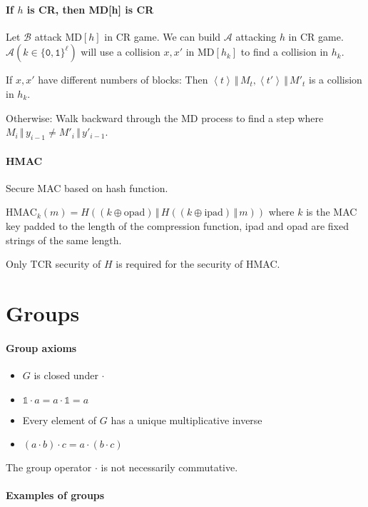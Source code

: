 \documentclass[11pt]{article}
\newcommand{\bit}{\ensuremath{\{\texttt{0},\texttt{1}\}}}
\newcommand{\ang}[1]{\ensuremath{\left\langle#1\right\rangle}}
\newcommand{\I}{\ensuremath{\mathds{1}}}
\theoremstyle{remark}
\begin{document}
\paragraph{If $h$ is CR, then MD[h] is CR}
Let $\mathcal{B}$ attack MD$[h]$ in CR game.
We can build $\mathcal{A}$ attacking $h$ in CR game.
$\mathcal{A}(k\in\bit^\ell)$ will use a collision
$x,x'$ in MD$[h_k]$ to find a collision in $h_k$.

If $x,x'$ have different numbers of blocks:
Then $\ang{t}\,\Vert\,M_t, \ang{t'}\,\Vert\,M'_t$ is a collision in $h_k$.

Otherwise: Walk backward through the MD process to find a step
where $M_i\,\Vert\,y_{i-1} \neq M'_i\,\Vert\,y'_{i-1}$.

\paragraph{HMAC} Secure MAC based on hash function.

$\text{HMAC}_k(m) = H(
  (k \oplus \text{opad})
  \,\Vert\,
  H(
    (k \oplus \text{ipad})
    \,\Vert\,
    m
  )
)$
where $k$ is the MAC key padded to the length of the compression function,
ipad and opad are fixed strings of the same length.

Only TCR security of $H$ is required for the security of HMAC.

\section{Groups}

\paragraph{Group axioms}

\begin{itemize}
\item $G$ is closed under $\cdot$
\item $\I\cdot a=a\cdot\I=a$
\item Every element of $G$ has a unique multiplicative inverse
\item $(a\cdot b)\cdot c=a\cdot(b\cdot c)$
\end{itemize}

The group operator $\cdot$ is not necessarily commutative.

\paragraph{Examples of groups}
\end{document}
